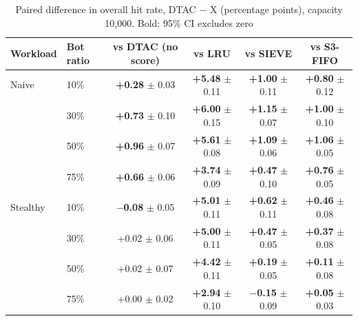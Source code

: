 \begin{table}[htbp]
    \centering
    \caption{Paired difference in overall hit rate, DTAC $-$ X (percentage points), capacity 10{,}000. Bold: 95\% CI excludes zero}
    \label{tab:app-paired-overall}
    \small
    \begin{tabular}{llcccc}
        \toprule
        Workload & Bot ratio & vs DTAC (no score) & vs LRU & vs SIEVE & vs S3-FIFO \\
        \midrule
        Naive & 10\% & \textbf{+0.28} $\pm$ 0.03 & \textbf{+5.48} $\pm$ 0.11 & \textbf{+1.00} $\pm$ 0.11 & \textbf{+0.80} $\pm$ 0.12 \\
         & 30\% & \textbf{+0.73} $\pm$ 0.10 & \textbf{+6.00} $\pm$ 0.15 & \textbf{+1.15} $\pm$ 0.07 & \textbf{+1.00} $\pm$ 0.10 \\
         & 50\% & \textbf{+0.96} $\pm$ 0.07 & \textbf{+5.61} $\pm$ 0.08 & \textbf{+1.09} $\pm$ 0.06 & \textbf{+1.06} $\pm$ 0.05 \\
         & 75\% & \textbf{+0.66} $\pm$ 0.06 & \textbf{+3.74} $\pm$ 0.09 & \textbf{+0.47} $\pm$ 0.10 & \textbf{+0.76} $\pm$ 0.05 \\
        \midrule
        Stealthy & 10\% & \textbf{$-$0.08} $\pm$ 0.05 & \textbf{+5.01} $\pm$ 0.11 & \textbf{+0.62} $\pm$ 0.11 & \textbf{+0.46} $\pm$ 0.08 \\
         & 30\% & +0.02 $\pm$ 0.06 & \textbf{+5.00} $\pm$ 0.11 & \textbf{+0.47} $\pm$ 0.05 & \textbf{+0.37} $\pm$ 0.08 \\
         & 50\% & +0.02 $\pm$ 0.07 & \textbf{+4.42} $\pm$ 0.11 & \textbf{+0.19} $\pm$ 0.05 & \textbf{+0.11} $\pm$ 0.08 \\
         & 75\% & +0.00 $\pm$ 0.02 & \textbf{+2.94} $\pm$ 0.10 & \textbf{$-$0.15} $\pm$ 0.09 & \textbf{+0.05} $\pm$ 0.03 \\
        \bottomrule
    \end{tabular}
\end{table}

